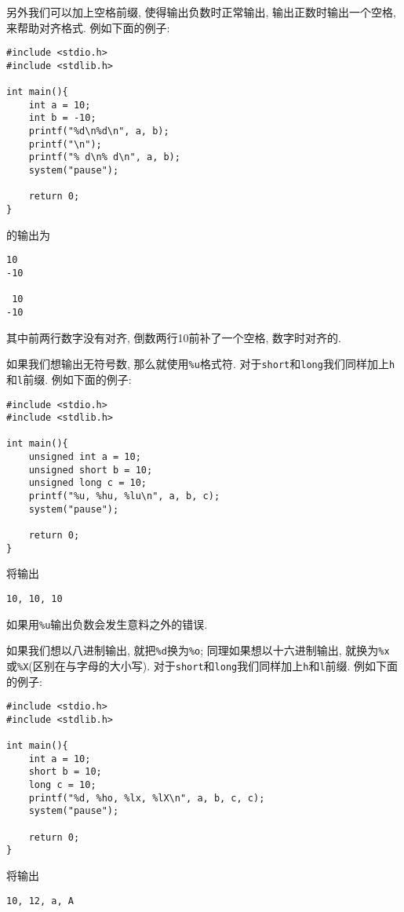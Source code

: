             另外我们可以加上空格前缀, 使得输出负数时正常输出, 输出正数时输出一个空格, 来帮助对齐格式. 例如下面的例子:
\begin{lstlisting}
#include <stdio.h>
#include <stdlib.h>

int main(){
    int a = 10;
    int b = -10;
    printf("%d\n%d\n", a, b);
    printf("\n");
    printf("% d\n% d\n", a, b);
    system("pause");

    return 0;
}
\end{lstlisting}
            的输出为
\begin{lstlisting}
10
-10

 10
-10
\end{lstlisting}
            
            其中前两行数字没有对齐, 倒数两行10前补了一个空格, 数字时对齐的.

            如果我们想输出无符号数, 那么就使用\texttt{\%u}格式符. 对于\texttt{short}和\texttt{long}我们同样加上\texttt{h}和\texttt{l}前缀. 例如下面的例子:
\begin{lstlisting}
#include <stdio.h>
#include <stdlib.h>

int main(){
    unsigned int a = 10;
    unsigned short b = 10;
    unsigned long c = 10;
    printf("%u, %hu, %lu\n", a, b, c);
    system("pause");

    return 0;
}
\end{lstlisting}
            将输出
\begin{lstlisting}
10, 10, 10
\end{lstlisting}

            如果用\texttt{\%u}输出负数会发生意料之外的错误.

            如果我们想以八进制输出, 就把\texttt{\%d}换为\texttt{\%o}; 同理如果想以十六进制输出, 就换为\texttt{\%x}或\texttt{\%X}(区别在与字母的大小写). 对于\texttt{short}和\texttt{long}我们同样加上\texttt{h}和\texttt{l}前缀. 例如下面的例子:
\begin{lstlisting}
#include <stdio.h>
#include <stdlib.h>

int main(){
    int a = 10;
    short b = 10;
    long c = 10;
    printf("%d, %ho, %lx, %lX\n", a, b, c, c);
    system("pause");

    return 0;
}
\end{lstlisting}
            将输出
\begin{lstlisting}
10, 12, a, A
\end{lstlisting}

